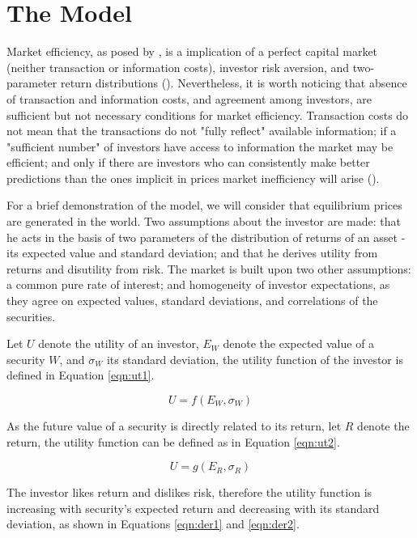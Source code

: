 \documentclass[cic,tc, english]{iiufrgs}
\begin{document}
\chapter{The Model} \label{chapter_model}

    Market efficiency, as posed by \citet{fama1970}, is a implication of a perfect capital market (neither transaction or information costs), investor risk aversion, and two-parameter return distributions (\citet{famamcbeth1973}). Nevertheless, it is worth noticing that absence of transaction and information costs, and agreement among investors, are sufficient but not necessary conditions for market efficiency. Transaction costs do not mean that the transactions do not "fully reflect" available information; if a "sufficient number" of investors have access to information the market may be efficient; and only if there are investors who can consistently make better predictions than the ones implicit in prices market inefficiency will arise (\citet{fama1970}).
    
    For a brief demonstration of the model, we will consider that equilibrium prices are generated in the \citet{sharpe1964} world. Two assumptions about the investor are made: that he acts in the basis of two parameters of the distribution of returns of an asset - its expected value and standard deviation; and that he derives utility from returns and disutility from risk. The market is built upon two other assumptions: a common pure rate of interest; and homogeneity of investor expectations, as they agree on expected values, standard deviations, and correlations of the securities.
    
    Let $U$ denote the utility of an investor, $E_W$ denote the expected value of a security $W$, and $\sigma_W$ its standard deviation, the utility function of the investor is defined in Equation \ref{eqn:ut1}.
    
    \begin{equation}
        \label{eqn:ut1}
        U = f(E_W, \sigma_W)
    \end{equation}
    
    As the future value of a security is directly related to its return, let $R$ denote the return, the utility function can be defined as in Equation \ref{eqn:ut2}.

    \begin{equation}
        \label{eqn:ut2}
        U = g(E_R, \sigma_R)
    \end{equation}

    The investor likes return and dislikes risk, therefore the utility function is increasing with security's expected return and decreasing with its standard deviation, as shown in Equations \ref{eqn:der1} and \ref{eqn:der2}.
    
\end{document}
